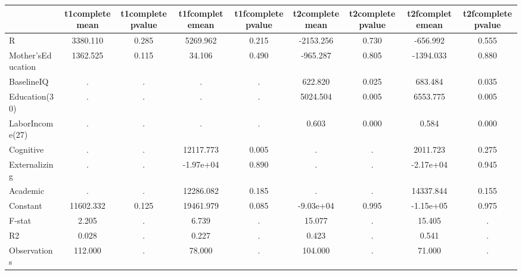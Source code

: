 \begin{table}[htbp]
\begin{tabular}{lcccccccc} \hline \hline
 & t1completemean  & t1completepvalue  & t1fcompletemean  & t1fcompletepvalue  & t2completemean  & t2completepvalue  & t2fcompletemean  & t2fcompletepvalue  \\  \hline 
R &  3380.110 &     0.285 &  5269.962 &     0.215 & -2153.256 &     0.730 &  -656.992 &     0.555 \\  
Mother'sEducation &  1362.525 &     0.115 &    34.106 &     0.490 &  -965.287 &     0.805 & -1394.033 &     0.880 \\  
BaselineIQ &         . &         . &         . &         . &   622.820 &     0.025 &   683.484 &     0.035 \\  
Education(30) &         . &         . &         . &         . &  5024.504 &     0.005 &  6553.775 &     0.005 \\  
LaborIncome(27) &         . &         . &         . &         . &     0.603 &     0.000 &     0.584 &     0.000 \\  
Cognitive &         . &         . & 12117.773 &     0.005 &         . &         . &  2011.723 &     0.275 \\  
Externalizing &         . &         . & -1.97e+04 &     0.890 &         . &         . & -2.17e+04 &     0.945 \\  
Academic &         . &         . & 12286.082 &     0.185 &         . &         . & 14337.844 &     0.155 \\  
Constant & 11602.332 &     0.125 & 19461.979 &     0.085 & -9.03e+04 &     0.995 & -1.15e+05 &     0.975 \\  
F-stat &     2.205 &         . &     6.739 &         . &    15.077 &         . &    15.405 &         . \\  
R2 &     0.028 &         . &     0.227 &         . &     0.423 &         . &     0.541 &         . \\  
Observations &   112.000 &         . &    78.000 &         . &   104.000 &         . &    71.000 &         . \\  
\hline \hline \end{tabular}
\end{table}
